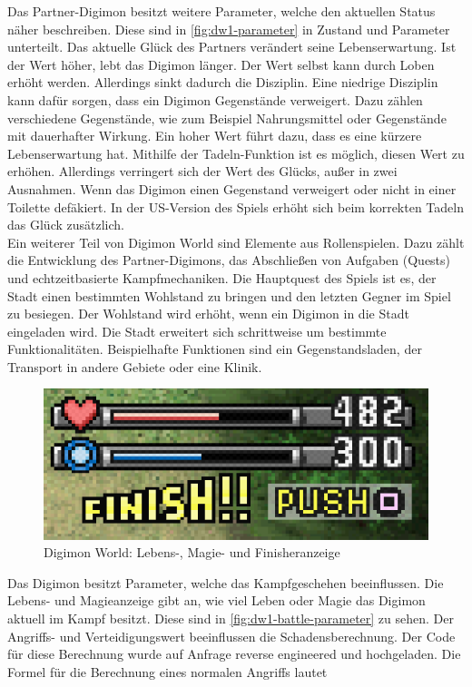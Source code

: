 Das Partner-Digimon besitzt weitere Parameter, welche den aktuellen Status näher beschreiben.
Diese sind in \autoref{fig:dw1-parameter} in Zustand und Parameter unterteilt.
Das aktuelle Glück des Partners verändert seine Lebenserwartung.
Ist der Wert höher, lebt das Digimon länger.
Der Wert selbst kann durch Loben erhöht werden.
Allerdings sinkt dadurch die Disziplin.
Eine niedrige Disziplin kann dafür sorgen, dass ein Digimon Gegenstände verweigert.
Dazu zählen verschiedene Gegenstände, wie zum Beispiel Nahrungsmittel oder Gegenstände mit dauerhafter Wirkung.
Ein hoher Wert führt dazu, dass es eine kürzere Lebenserwartung hat.
Mithilfe der Tadeln-Funktion ist es möglich, diesen Wert zu erhöhen.
Allerdings verringert sich der Wert des Glücks, außer in zwei Ausnahmen.
Wenn das Digimon einen Gegenstand verweigert oder nicht in einer Toilette defäkiert.
In der US-Version des Spiels erhöht sich beim korrekten Tadeln das Glück zusätzlich. \\

Ein weiterer Teil von Digimon World sind Elemente aus Rollenspielen.
Dazu zählt die Entwicklung des Partner-Digimons, das Abschließen von Aufgaben (Quests) und echtzeitbasierte Kampfmechaniken.
Die Hauptquest des Spiels ist es, der Stadt einen bestimmten Wohlstand zu bringen und den letzten Gegner im Spiel zu besiegen.
Der Wohlstand wird erhöht, wenn ein Digimon in die Stadt eingeladen wird. Die Stadt erweitert sich schrittweise um bestimmte Funktionalitäten.
Beispielhafte Funktionen sind ein Gegenstandsladen, der Transport in andere Gebiete oder eine Klinik.\\

\begin{figure}[H]
  \begin{center}
    \includegraphics[width=0.7\columnwidth]{figures/screenshots/battle-parameter.png}
    \caption{\label{fig:dw1-battle-parameter} Digimon World: Lebens-, Magie- und Finisheranzeige}
  \end{center}
\end{figure}

Das Digimon besitzt Parameter, welche das Kampfgeschehen beeinflussen.
Die Lebens- und Magieanzeige gibt an, wie viel Leben oder Magie das Digimon aktuell im Kampf besitzt.
Diese sind in \autoref{fig:dw1-battle-parameter} zu sehen.
Der Angriffs- und Verteidigungswert beeinflussen die Schadensberechnung.
Der Code für diese Berechnung wurde auf Anfrage reverse engineered und hochgeladen\cite{calculatedamage}.
Die Formel für die Berechnung eines normalen Angriffs lautet

